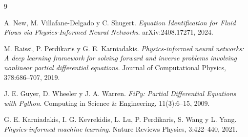 \documentclass[10pt,letterpaper,twocolumn]{article}
\begin{document}
\begin{thebibliography}{9}

A. New, M. Villafane-Delgado y C. Shugert. \textit{Equation Identification for Fluid Flows via Physics-Informed Neural Networks}. arXiv:2408.17271, 2024.

M. Raissi, P. Perdikaris y G. E. Karniadakis. \textit{Physics-informed neural networks: A deep learning framework for solving forward and inverse problems involving nonlinear partial differential equations}. Journal of Computational Physics, 378:686--707, 2019.

J. E. Guyer, D. Wheeler y J. A. Warren. \textit{FiPy: Partial Differential Equations with Python}. Computing in Science \& Engineering, 11(3):6--15, 2009.

G. E. Karniadakis, I. G. Kevrekidis, L. Lu, P. Perdikaris, S. Wang y L. Yang. \textit{Physics-informed machine learning}. Nature Reviews Physics, 3:422--440, 2021.

\end{thebibliography}
\end{document}
